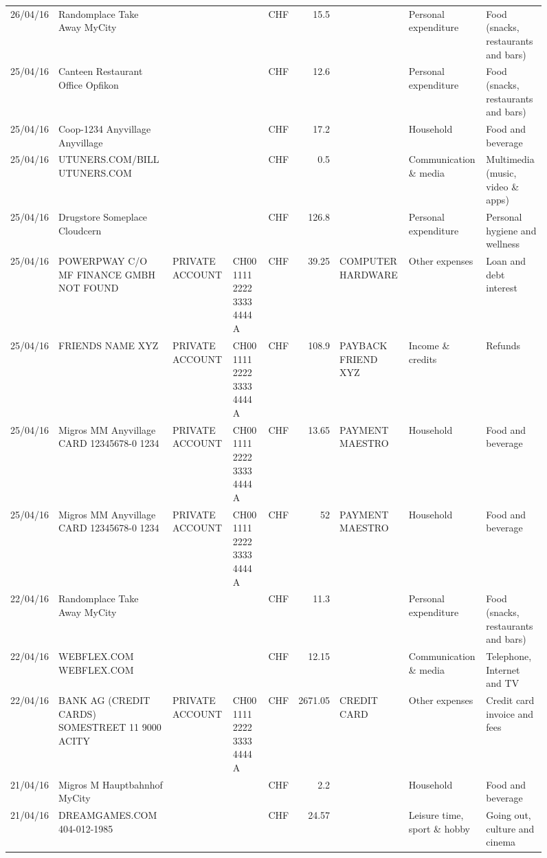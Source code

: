 \begin{landscape}
\begin{sidewaysfigure}
\begin{table}[h]
\begin{center}
\begin{tabular}{rllllrlll}
		26/04/16 & Randomplace Take Away     MyCity &       &       & CHF   & 15.5  &       & Personal expenditure & Food (snacks, restaurants and bars) \\
		25/04/16 & Canteen Restaurant Office      Opfikon &       &       & CHF   & 12.6  &       & Personal expenditure & Food (snacks, restaurants and bars) \\
		25/04/16 & Coop-1234 Anyvillage    Anyvillage &       &       & CHF   & 17.2  &       & Household & Food and beverage \\
		25/04/16 & UTUNERS.COM/BILL          UTUNERS.COM &       &       & CHF   & 0.5   &       & Communication \& media & Multimedia (music, video \& apps) \\
		25/04/16 & Drugstore Someplace      Cloudcern &       &       & CHF   & 126.8 &       & Personal expenditure & Personal hygiene and wellness \\
		25/04/16 & POWERPWAY C/O MF FINANCE GMBH NOT FOUND & PRIVATE ACCOUNT & CH00 1111 2222 3333 4444 A & CHF   & 39.25 & COMPUTER HARDWARE & Other expenses & Loan and debt interest \\
		25/04/16 & FRIENDS NAME XYZ & PRIVATE ACCOUNT & CH00 1111 2222 3333 4444 A & CHF   & 108.9 & PAYBACK FRIEND XYZ & Income \& credits & Refunds \\
		25/04/16 & Migros MM Anyvillage CARD 12345678-0 1234 & PRIVATE ACCOUNT & CH00 1111 2222 3333 4444 A & CHF   & 13.65 & PAYMENT MAESTRO & Household & Food and beverage \\
		25/04/16 & Migros MM Anyvillage CARD 12345678-0 1234 & PRIVATE ACCOUNT & CH00 1111 2222 3333 4444 A & CHF   & 52    & PAYMENT MAESTRO & Household & Food and beverage \\
		22/04/16 & Randomplace Take Away     MyCity &       &       & CHF   & 11.3  &       & Personal expenditure & Food (snacks, restaurants and bars) \\
		22/04/16 & WEBFLEX.COM              WEBFLEX.COM &       &       & CHF   & 12.15 &       & Communication \& media & Telephone,  Internet and TV \\
		22/04/16 & BANK AG (CREDIT CARDS) SOMESTREET 11 9000 ACITY & PRIVATE ACCOUNT & CH00 1111 2222 3333 4444 A & CHF   & 2671.05 & CREDIT CARD & Other expenses & Credit card invoice and fees \\
		21/04/16 & Migros M Hauptbahnhof    MyCity &       &       & CHF   & 2.2   &       & Household & Food and beverage \\
		21/04/16 & DREAMGAMES.COM           404-012-1985 &       &       & CHF   & 24.57 &       & Leisure time, sport \& hobby & Going out, culture and cinema \\

\end{tabular}
\end{center}
\end{table}
\end{sidewaysfigure}
\end{landscape}
